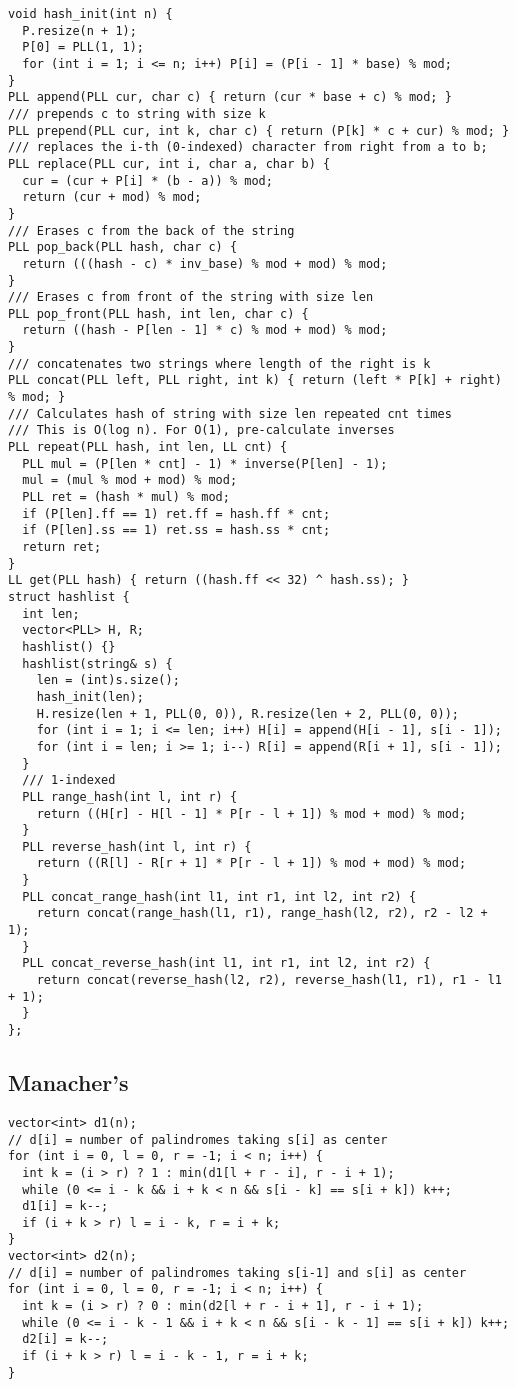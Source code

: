 \documentclass[FSZ,a4paper,onesided]{article}
\begin{document}
\begin{multicols*}{\COLS}
\begin{lstlisting}
void hash_init(int n) {
  P.resize(n + 1);
  P[0] = PLL(1, 1);
  for (int i = 1; i <= n; i++) P[i] = (P[i - 1] * base) % mod;
}
PLL append(PLL cur, char c) { return (cur * base + c) % mod; }
/// prepends c to string with size k
PLL prepend(PLL cur, int k, char c) { return (P[k] * c + cur) % mod; }
/// replaces the i-th (0-indexed) character from right from a to b;
PLL replace(PLL cur, int i, char a, char b) {
  cur = (cur + P[i] * (b - a)) % mod;
  return (cur + mod) % mod;
}
/// Erases c from the back of the string
PLL pop_back(PLL hash, char c) {
  return (((hash - c) * inv_base) % mod + mod) % mod;
}
/// Erases c from front of the string with size len
PLL pop_front(PLL hash, int len, char c) {
  return ((hash - P[len - 1] * c) % mod + mod) % mod;
}
/// concatenates two strings where length of the right is k
PLL concat(PLL left, PLL right, int k) { return (left * P[k] + right) % mod; }
/// Calculates hash of string with size len repeated cnt times
/// This is O(log n). For O(1), pre-calculate inverses
PLL repeat(PLL hash, int len, LL cnt) {
  PLL mul = (P[len * cnt] - 1) * inverse(P[len] - 1);
  mul = (mul % mod + mod) % mod;
  PLL ret = (hash * mul) % mod;
  if (P[len].ff == 1) ret.ff = hash.ff * cnt;
  if (P[len].ss == 1) ret.ss = hash.ss * cnt;
  return ret;
}
LL get(PLL hash) { return ((hash.ff << 32) ^ hash.ss); }
struct hashlist {
  int len;
  vector<PLL> H, R;
  hashlist() {}
  hashlist(string& s) {
    len = (int)s.size();
    hash_init(len);
    H.resize(len + 1, PLL(0, 0)), R.resize(len + 2, PLL(0, 0));
    for (int i = 1; i <= len; i++) H[i] = append(H[i - 1], s[i - 1]);
    for (int i = len; i >= 1; i--) R[i] = append(R[i + 1], s[i - 1]);
  }
  /// 1-indexed
  PLL range_hash(int l, int r) {
    return ((H[r] - H[l - 1] * P[r - l + 1]) % mod + mod) % mod;
  }
  PLL reverse_hash(int l, int r) {
    return ((R[l] - R[r + 1] * P[r - l + 1]) % mod + mod) % mod;
  }
  PLL concat_range_hash(int l1, int r1, int l2, int r2) {
    return concat(range_hash(l1, r1), range_hash(l2, r2), r2 - l2 + 1);
  }
  PLL concat_reverse_hash(int l1, int r1, int l2, int r2) {
    return concat(reverse_hash(l2, r2), reverse_hash(l1, r1), r1 - l1 + 1);
  }
};
\end{lstlisting}
\subsection{Manacher's}
\begin{lstlisting}
vector<int> d1(n);
// d[i] = number of palindromes taking s[i] as center
for (int i = 0, l = 0, r = -1; i < n; i++) {
  int k = (i > r) ? 1 : min(d1[l + r - i], r - i + 1);
  while (0 <= i - k && i + k < n && s[i - k] == s[i + k]) k++;
  d1[i] = k--;
  if (i + k > r) l = i - k, r = i + k;
}
vector<int> d2(n);
// d[i] = number of palindromes taking s[i-1] and s[i] as center
for (int i = 0, l = 0, r = -1; i < n; i++) {
  int k = (i > r) ? 0 : min(d2[l + r - i + 1], r - i + 1);
  while (0 <= i - k - 1 && i + k < n && s[i - k - 1] == s[i + k]) k++;
  d2[i] = k--;
  if (i + k > r) l = i - k - 1, r = i + k;
}
\end{lstlisting}

\end{multicols*}
\end{document}
